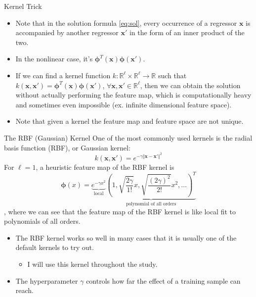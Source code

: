 \documentclass[aspectratio=169]{beamer}
\begin{document}
\begin{frame}{Kernel Trick}
\begin{itemize}
  \item Note that in the solution formula \ref{eq:sol}, every occurrence of a regressor $\mathbf{x}$ is accompanied by another regressor $\mathbf{x}'$ in the form of an inner product of the two.
  \item In the nonlinear case, it's $\bm{\phi}^T(\mathbf{x})\bm{\phi}(\mathbf{x}')$.
  \item If we can find a kernel function $k:\mathbb{R}^\ell\times\mathbb{R}^\ell\rightarrow\mathbb{R}$ such that $k(\mathbf{x},\mathbf{x}')=\bm{\phi}^T(\mathbf{x})\bm{\phi}(\mathbf{x}')$, $\forall\mathbf{x},\mathbf{x}'\in\mathbb{R}^\ell$, then we can obtain the solution without actually performing the feature map, which is computationally heavy and sometimes even impossible (ex. infinite dimensional feature space).
  \item Note that given a kernel the feature map and feature space are not unique.
\end{itemize}
\end{frame}

\begin{frame}{The RBF (Gaussian) Kernel}
\footnotesize
One of the most commonly used kernels is the radial basis function (RBF), or Gaussian kernel:
\begin{equation}
  k(\mathbf{x},\mathbf{x}')=e^{-\gamma\Vert\mathbf{x}-\mathbf{x}'\Vert^2}
\end{equation}
For $\ell=1$, a heuristic feature map of the RBF kernel is
\begin{equation}
  \bm{\phi}(x)=\underbrace{e^{-\gamma x^2}}_\text{local}\underbrace{\left(1,\sqrt{\frac{2\gamma}{1!}}x,\sqrt{\frac{(2\gamma)^2}{2!}}x^2,\dots\right)^T}_\text{polynomial of all orders}
\end{equation}
, where we can see that the feature map of the RBF kernel is like local fit to polynomials of all orders.
\begin{itemize}
  \item The RBF kernel works so well in many cases that it is usually one of the default kernels to try out.
  \begin{itemize}
    \scriptsize
    \item I will use this kernel throughout the study.
  \end{itemize}
    \item The hyperparameter $\gamma$ controls how far the effect of a training sample can reach.
\end{itemize}
\end{frame}
\end{document}
